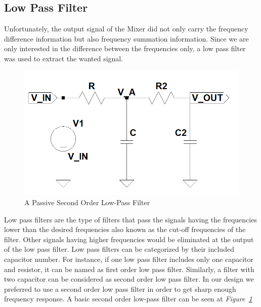 \documentclass[paper]{IEEEtran}
\begin{document}

		
				
\subsection{Low Pass Filter}


	Unfortunately, the output signal of the Mixer did not only carry the frequency difference information but also frequency summation information. Since we are only interested in the difference between the frequencies only, a low pass filter was used to extract the wanted signal.


\begin{figure}[h!]
	\setlength{\unitlength}{\textwidth}
	\center 
	\includegraphics[width=0.5\unitlength]{lpf_v4.png}
	\caption{\label{fig:pslpf}A Passive Second Order Low-Pass Filter }
\end{figure} 	
	
	Low pass filters are the type of filters that pass the signals having the frequencies lower than the desired frequencies also known as the cut-off frequencies of the filter. Other signals having higher frequencies would be eliminated at the output of the low pass filter. Low pass filters can be categorized by their included capacitor number. For instance, if one low pass filter includes only one capacitor and resistor, it can be named as first order low pass filter. Similarly, a filter with two capacitor can be considered as second order low pass filter. In our design we preferred to use a second order low pass filter in order to get sharp enough frequency response. A basic second order low-pass filter can be seen at \textit{Figure~\ref{fig:pslpf}} \\ 
	
\end{document}
